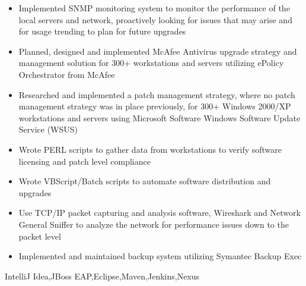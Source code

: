 \begin{experiences}
{\begin{itemize}
                        \item Implemented SNMP monitoring system to monitor the performance of the local servers and network, proactively looking for issues that may arise and for usage trending to plan for future upgrades
                        \item Planned, designed and implemented McAfee Antivirus upgrade strategy and management solution for 300+ workstations and servers utilizing ePolicy Orchestrator from McAfee
                        \item Researched and implemented a patch management strategy, where no patch management strategy was in place previously, for 300+ Windows 2000/XP workstations and servers using Microsoft Software Windows Software Update Service (WSUS)
                        \item Wrote PERL scripts to gather data from workstations to verify software licensing and patch level compliance
                        \item Wrote VBScript/Batch scripts to automate software distribution and upgrades
                        \item Use TCP/IP packet capturing and analysis software, Wireshark and Network General Sniffer to analyze the network for performance issues down to the packet level
                        \item Implemented and maintained backup system utilizing Symantec Backup Exec
                      \end{itemize}
                    }
                    {IntelliJ Idea,JBoss EAP,Eclipse,Maven,Jenkins,Nexus}
\end{experiences}
